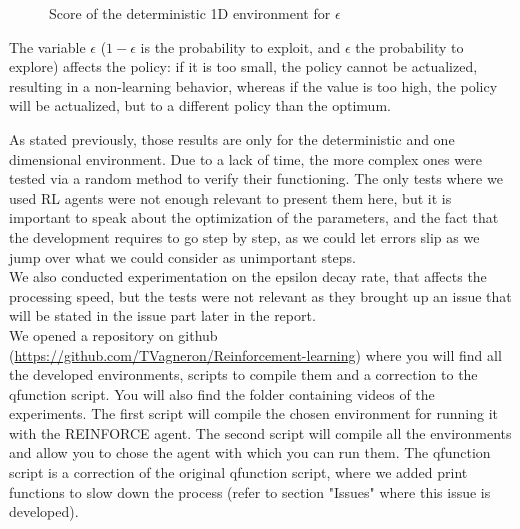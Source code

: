 \documentclass[conference]{IEEEtran}
\begin{document}
\begin{figure}
\caption{Score of the deterministic 1D environment for $\epsilon$}
\end{figure}

The variable $\epsilon$ ($1-\epsilon$ is the probability to exploit, and $\epsilon$ the probability to explore) affects the policy: if it is too small, the policy cannot be actualized, resulting in a non-learning behavior, whereas if the value is too high, the policy will be actualized, but to a different policy than the optimum.
 
 As stated previously, those results are only for the deterministic and one dimensional environment. Due to a lack of time, the more complex ones were tested via a random method to verify their functioning. The only tests where we used RL agents were not enough relevant to present them here, but it is important to speak about the optimization of the parameters, and the fact that the development requires to go step by step, as we could let errors slip as we jump over what we could consider as unimportant steps.\\

We also conducted experimentation on the epsilon decay rate, that affects the processing speed, but the tests were not relevant as they brought up an issue that will be stated in the issue part later in the report.\\

We opened a repository on github (\url{https://github.com/TVagneron/Reinforcement-learning}) where you will find all the developed environments, scripts to compile them and a correction to the qfunction script. You will also find the folder containing videos of the experiments.
The first script will compile the chosen environment for running it with the REINFORCE agent. The second script will compile all the environments and allow you to chose the agent with which you can run them.
The qfunction script is a correction of the original qfunction script, where we added print functions to slow down the process (refer to section "Issues" where this issue is developed).\\
\end{document}
